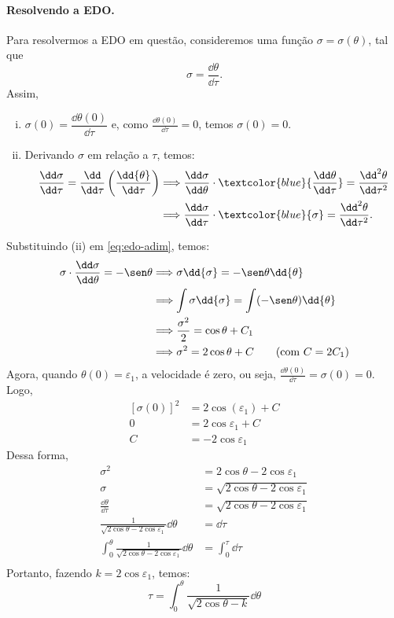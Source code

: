 \begin{solution}
\paragraph{\small Resolvendo a EDO.} %
%
Para resolvermos a EDO em questão, consideremos uma função 
$\sigma = \sigma(\theta)$, tal que 
\[
 \sigma = \frac{\dd\theta}{\dd\tau}.
\]
Assim,
\begin{enumerate}[(i)]
	\item $\sigma (0) = \dfrac{\dd\theta(0)}{\dd\tau}$ e, como 
	 $\frac{\dd\theta(0)}{\dd{\tau}} = 0$, temos $\sigma(0) =0$.
	\item Derivando $\sigma$ em relação a $\tau$, temos:
	 \begin{align*}
		 \frac{\dd\sigma}{\dd\tau} = \frac{\dd}{\dd\tau} \left(\frac{\dd{\theta}}{\dd\tau}\right) 
			&\Longrightarrow \frac{\dd\sigma}{\dd\theta}\cdot \textcolor{blue}{\frac{\dd\theta}{\dd\tau}} = \frac{\dd^2\theta}{\dd\tau^2}\\
			&\Longrightarrow \frac{\dd\sigma}{\dd\tau}\cdot \textcolor{blue}{\sigma} =  \frac{\dd^2\theta}{\dd\tau^2}.
		\end{align*}
\end{enumerate}
Substituindo (ii) em \eqref{eq:edo-adim}, temos:
\begin{align*}
 \sigma \cdot \frac{\dd\sigma}{\dd\theta} = - \sen\theta 
 &\Longrightarrow \sigma \dd{\sigma} = -\sen\theta\dd{\theta}\\
	&\Longrightarrow \int\sigma \dd{\sigma} = \int (-\sen\theta)\dd{\theta}\\
	&\Longrightarrow \frac{\sigma^2}{2} = \cos\theta + C_1\\
	&\Longrightarrow \sigma^2 = 2\cos\theta + C \tag{com $C=2C_1$}
\end{align*}
Agora, quando $\theta (0) = \varepsilon_1$, a velocidade é zero, ou seja, 
$\frac{\dd\theta(0)}{\dd{\tau}} = \sigma(0) =0$.
Logo,
\begin{align*}
 \left[\sigma(0)\right]^2 &= 2\cos(\varepsilon_1) + C\\
	0 &= 2\cos\varepsilon_1 + C\\
	C &= -2\cos\varepsilon_1
\end{align*}
Dessa forma,
\begin{align*}
 \sigma^2 &= 2\cos\theta - 2\cos\varepsilon_1\\
	\sigma   &= \sqrt{2\cos\theta - 2\cos\varepsilon_1}\\
	\frac{\dd\theta}{\dd\tau} &= \sqrt{2\cos\theta - 2\cos\varepsilon_1}\\
	\frac{1}{\sqrt{2\cos\theta - 2\cos\varepsilon_1}}\dd{\theta} &= \dd\tau\\
	\int_{0}^{\theta}\frac{1}{\sqrt{2\cos\theta - 2\cos\varepsilon_1}}\dd{\theta} &= \int_{0}^{\tau}\dd\tau\\
\end{align*}
Portanto, fazendo $ k = 2\cos{\varepsilon_1} $, temos:
\begin{equation}
 \tau = \int_{0}^{\theta}\frac{1}{\sqrt{2\cos\theta - k}}\dd{\theta}
\label{eq:eliptica-dim}
\end{equation}


\end{solution}
